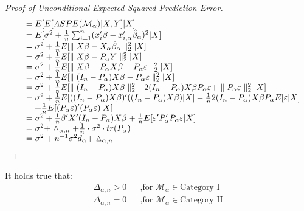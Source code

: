 \documentclass[Research_Module_ES.tex]{subfiles}
\begin{document}
\begin{proof}[Proof of Unconditional Expected Squared Prediction Error]
\begin{align*}
\begin{tabular}{ll}
	&$=E[E[ASPE(\mathcal{M}_\alpha)|X,Y]|X]$\\
	&$=E[\sigma^2+\frac{1}{n}\sum_{i=1}^{n}(x_i^\prime\beta-x_{i,\alpha}^\prime\hat{\beta}_\alpha)^2|X]$\\
	&$=\sigma^2+\frac{1}{n}E[\parallel X\beta-X_\alpha\hat{\beta}_\alpha\parallel_2^2|X]$\\
	&$=\sigma^2+\frac{1}{n}E[\parallel X\beta-P_\alpha Y\parallel_2^2|X]$\\
	&$=\sigma^2+\frac{1}{n}E[\parallel X\beta-P_\alpha X\beta-P_\alpha\varepsilon\parallel_2^2|X]$\\
	&$=\sigma^2+\frac{1}{n}E[\parallel (I_n-P_\alpha)X\beta-P_\alpha\varepsilon\parallel_2^2|X]$\\
	&$=\sigma^2+\frac{1}{n}E[\parallel (I_n-P_\alpha)X\beta\parallel_2^2-2(I_n-P_\alpha)X\beta P_\alpha\varepsilon+\parallel P_\alpha\varepsilon\parallel_2^2|X]$\\
	&$=\sigma^2+\frac{1}{n}E[((I_n-P_\alpha)X\beta)^\prime((I_n-P_\alpha)X\beta)|X]-\frac{1}{n}2(I_n-P_\alpha)X\beta P_\alpha E[\varepsilon|X]$\\
	&$~~~+\frac{1}{n}E[(P_\alpha\varepsilon)^\prime (P_\alpha\varepsilon)|X]$\\
	&$=\sigma^2+\frac{1}{n}\beta^\prime X^\prime (I_n-P_\alpha)X\beta+\frac{1}{n}E[\varepsilon^\prime P_\alpha^\prime P_\alpha\varepsilon|X]$\\
	&$=\sigma^2+\vartriangle_{\alpha,n}+\frac{1}{n}\cdot\sigma^2\cdot tr(P_\alpha)$\\
	&$=\sigma^2+n^{-1}\sigma^2d_\alpha+\vartriangle_{\alpha,n}$
	\end{tabular}
	\end{align*}
\end{proof}	

\begin{lemma}
	\label{Equation2.3-2.4}
	It holds true that:
	\begin{align*}
	&&\Delta_{\alpha,n}>0 && \text{,for } \mathcal{M}_\alpha\in\text{Category I}&&\\
	&&\Delta_{\alpha,n}=0 && \text{,for } \mathcal{M}_\alpha\in\text{Category II}&&
	\end{align*}
\end{lemma}
\end{document}
